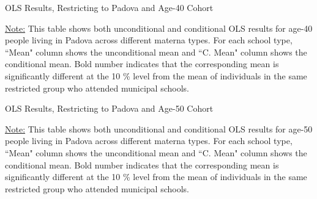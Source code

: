 \documentclass[11pt]{article}
\begin{document}
\begin{table}[H]
\begin{center}
	\caption{OLS Results, Restricting to Padova and Age-40 Cohort} \label{table:OLS-V40-E}
	\scalebox{0.73}{
		
	}
	\end{center}
	\footnotesize
\underline{Note:} This table shows both unconditional and conditional OLS results for age-40 people living in Padova across different materna types. For each school type, ``Mean" column shows the unconditional mean and ``C. Mean" column shows the conditional mean. Bold number indicates that the corresponding mean is significantly different at the 10 \% level from the mean of individuals in the same restricted group who attended municipal schools.

\end{table}

\begin{table}[H]
\begin{center}
	\caption{OLS Results, Restricting to Padova and Age-50 Cohort} \label{table:OLS-V50-E}
	\scalebox{0.75}{
		
	}
	\end{center}
	\footnotesize
\underline{Note:} This table shows both unconditional and conditional OLS results for age-50 people living in Padova across different materna types. For each school type, ``Mean" column shows the unconditional mean and ``C. Mean" column shows the conditional mean. Bold number indicates that the corresponding mean is significantly different at the 10 \% level from the mean of individuals in the same restricted group who attended municipal schools.

\end{table}
\end{document}
